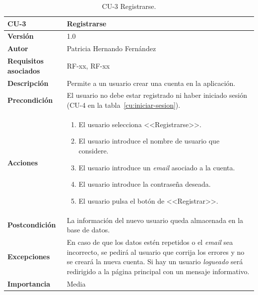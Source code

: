 \begin{table}[p]
	\centering
	\begin{tabularx}{\linewidth}{ p{} p{} }
		\toprule
		\textbf{CU-3}    & \textbf{Registrarse}\\
		\toprule
		\textbf{Versión}              & 1.0    \\
		\textbf{Autor}                & Patricia Hernando Fernández \\
		\textbf{Requisitos asociados} & RF-xx, RF-xx \\
		\textbf{Descripción}          & Permite a un usuario crear una cuenta en la aplicación.\\
		\textbf{Precondición}         & El usuario no debe estar registrado ni haber iniciado sesión (CU-4 en la tabla~\ref{cu:iniciar-sesion}). \\
		\textbf{Acciones}             &
		\begin{enumerate}
			\def\labelenumi{\arabic{enumi}.}
			\tightlist
			\item El usuario selecciona <<Registrarse>>.
			\item El usuario introduce el nombre de usuario que considere.
			\item El usuario introduce un \textit{email} asociado a la cuenta.
			\item El usuario introduce la contraseña deseada.
			\item El usuario pulsa el botón de <<Registrar>>.
		\end{enumerate}\\
		\textbf{Postcondición}        & La información del nuevo usuario queda almacenada en la base de datos. \\
		\textbf{Excepciones}          & En caso de que los datos estén repetidos o el \textit{email} sea incorrecto, se pedirá al usuario que corrija los errores y no se creará la nueva cuenta. Si hay un usuario \textit{logueado} será redirigido a la página principal con un mensaje informativo.\\
		\textbf{Importancia}          & Media \\
		\bottomrule
	\end{tabularx}
	\caption{CU-3 Registrarse.}
	\label{cu:registrarse}
\end{table}


